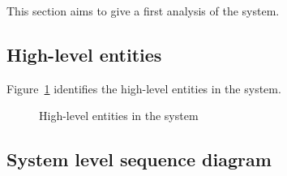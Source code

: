 This section aims to give a first analysis of the system.

\subsection{High-level entities}
	Figure~\ref{fig:analysis-model} identifies the high-level entities in the system.
	
	\begin{figure}[H]
		\centering
		\caption{High-level entities in the system}
		\label{fig:analysis-model}
	\end{figure}
	
\subsection{System level sequence diagram}
